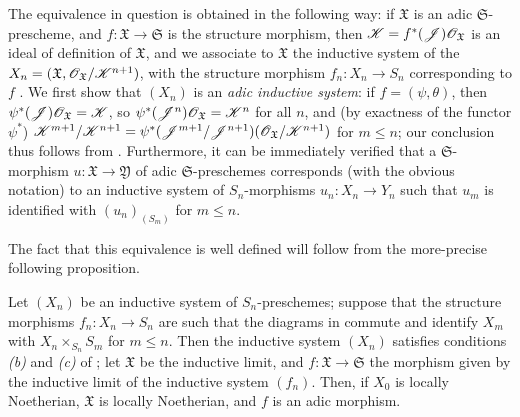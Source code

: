 The equivalence in question is obtained in the following way:
if $\mathfrak{X}$ is an adic $\mathfrak{S}$-prescheme, and $f:\mathfrak{X}\to\mathfrak{S}$ is the structure morphism, then $\mathscr{K}=f^*(\mathscr{J})\mathscr{O}_\mathfrak{X}$ is an ideal of definition of $\mathfrak{X}$, and we associate to $\mathfrak{X}$ the inductive system of the $X_n=(\mathfrak{X},\mathscr{O}_\mathfrak{X}/\mathscr{K}^{n+1})$, with the structure morphism $f_n:X_n\to S_n$ corresponding to $f$ .
We first show that $(X_n)$ is an \emph{adic inductive system}:
if $f=(\psi,\theta)$, then $\psi^*(\mathscr{J})\mathscr{O}_\mathfrak{X}=\mathscr{K}$, so $\psi^*(\mathscr{J}^n)\mathscr{O}_\mathfrak{X}=\mathscr{K}^n$ for all $n$, and (by exactness of the functor $\psi^*$) $\mathscr{K}^{m+1}/\mathscr{K}^{n+1}=\psi^*(\mathscr{J}^{m+1}/\mathscr{J}^{n+1})(\mathscr{O}_\mathfrak{X}/\mathscr{K}^{n+1})$ for $m\leq n$;
our conclusion thus follows from .
Furthermore, it can be immediately verified that a $\mathfrak{S}$-morphism $u:\mathfrak{X}\to\mathfrak{Y}$ of adic $\mathfrak{S}$-preschemes corresponds (with the obvious notation)
to an inductive system of $S_n$-morphisms $u_n:X_n\to Y_n$ such that $u_m$ is identified with $(u_n)_{(S_m)}$ for $m\leq n$.

The fact that this equivalence is well defined will follow from the more-precise following proposition.

\begin{proposition}[10.12.3.1]
\label{1.10.12.3.1}
Let $(X_n)$ be an inductive system of $S_n$-preschemes;
suppose that the structure morphisms $f_n:X_n\to S_n$ are such that the diagrams in  commute and identify $X_m$ with $X_n\times_{S_n}S_m$ for $m\leq n$.
Then the inductive system $(X_n)$ satisfies conditions \emph{(b)} and \emph{(c)} of ;
let $\mathfrak{X}$ be the inductive limit, and $f:\mathfrak{X}\to\mathfrak{S}$ the morphism given by the inductive limit of the inductive system $(f_n)$.
Then, if $X_0$ is locally Noetherian, $\mathfrak{X}$ is locally Noetherian, and $f$ is an adic morphism.
\end{proposition}

